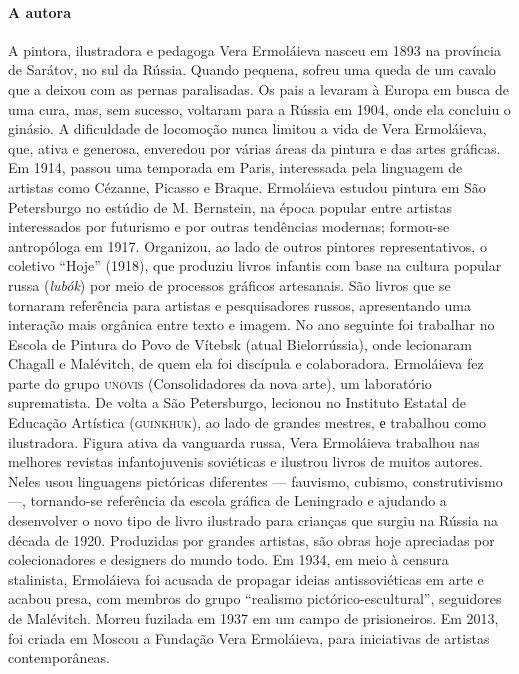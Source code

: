 \documentclass[11pt]{extarticle}
\begin{document}
\paragraph{A autora} A pintora, ilustradora e pedagoga Vera Ermoláieva nasceu em 1893 na província de Sarátov, no sul da Rússia. Quando pequena, sofreu uma queda de um cavalo que a deixou com as pernas paralisadas. Os pais a levaram à Europa em busca de uma cura, mas, sem sucesso, voltaram para a Rússia em 1904, onde ela concluiu o ginásio. A dificuldade de locomoção nunca limitou a vida de Vera Ermoláieva, que, ativa e generosa, enveredou por várias áreas da pintura e das artes gráficas.
Em 1914, passou uma temporada em Paris, interessada pela linguagem de artistas
como Cézanne, Picasso e Braque. Ermoláieva estudou pintura em São Petersburgo no estúdio de M. Bernstein, na época popular entre artistas interessados por futurismo e por outras tendências modernas; formou-se antropóloga em 1917. Organizou, ao lado de outros pintores representativos, o coletivo “Hoje” (1918), que produziu livros infantis com base na cultura popular russa (\textit{lubók}) por meio
de processos gráficos artesanais. São livros que se tornaram referência para artistas e
pesquisadores russos, apresentando uma interação mais orgânica entre texto e imagem. No
ano seguinte foi trabalhar no Escola de Pintura do Povo de Vítebsk (atual Bielorrússia), onde
lecionaram Chagall e Malévitch, de quem ela foi discípula e colaboradora. Ermoláieva fez parte
do grupo \textsc{unovis} (Consolidadores da nova arte), um laboratório suprematista. De volta a São
Petersburgo, lecionou no Instituto Estatal de Educação Artística (\textsc{guinkhuk}), ao lado de
grandes mestres, е trabalhou como ilustradora.
Figura ativa da vanguarda russa, Vera Ermoláieva trabalhou nas melhores revistas
infantojuvenis soviéticas e ilustrou livros de muitos autores. Neles usou linguagens pictóricas diferentes --- fauvismo, cubismo, construtivismo ---, tornando-se referência da escola gráfica de Leningrado e ajudando a desenvolver o novo tipo de livro ilustrado para crianças que surgiu na
Rússia na década de 1920. Produzidas por grandes artistas, são obras hoje apreciadas por
colecionadores e designers do mundo todo.
Em 1934, em meio à censura stalinista, Ermoláieva foi acusada de propagar ideias
antissoviéticas em arte e acabou presa, com membros do grupo “realismo pictórico-escultural”, seguidores de Malévitch. Morreu fuzilada em 1937 em um campo de prisioneiros.
Em 2013, foi criada em Moscou a Fundação Vera Ermoláieva, para iniciativas de artistas
contemporâneas.
\end{document}
